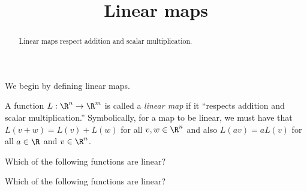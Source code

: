 \documentclass{ximera}
\title{Linear maps}
\begin{document}
\begin{abstract}
  Linear maps respect addition and scalar multiplication.
\end{abstract}

We begin by defining linear maps.

\begin{definition}
  A function $L: \R^n \to \R^m$ is called a \textit{linear map} if it
  ``respects addition and scalar multiplication.''  Symbolically, for
  a map to be linear, we must have that $L(v+w) = L(v)+L(w)$ for all
  $v,w \in \R^n$ and also $L(av) = a L(v)$ for all $a \in \R$ and
  $v\in \R^n$.
\end{definition}

\begin{question}
  Which of the following functions are linear?
  \begin{solution}
    \begin{multiple-choice}

    \end{multiple-choice}
  \end{solution}
\end{question}

\begin{question}
  Which of the following functions are linear?
  \begin{solution}
    \begin{multiple-choice}
    \choice[correct]{$h:\R \to \R^4$ defined by $h(x) = \verticalvector{x\\x\\x\\4x\right)$}
    \end{multiple-choice}
  \end{solution}
\end{question}
\end{document}
